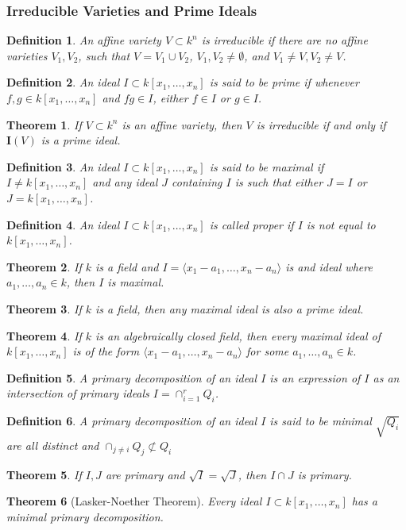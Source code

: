 \documentclass[oneside]{book}
\theoremstyle{mystyle}
\newtheorem{theorem}{Theorem}[section]
\newtheorem{definition}{Definition}[section]
\begin{document}
\subsubsection{Irreducible Varieties and Prime Ideals}
\begin{definition}
An affine variety $V\subset k^n$ is irreducible if there are no affine varieties $V_1, V_2$, such that $V = V_1\cup V_2$, $V_1,V_2\ne \emptyset$, and $V_1 \ne V, V_2 \ne V$.
\end{definition}
\begin{definition}
An ideal $I\subset k[x_1,\hdots ,x_n]$ is said to be prime if whenever $f,g\in k[x_1,\hdots ,x_n]$ and $fg\in I$, either $f\in I$ or $g\in I$.
\end{definition}
\begin{theorem}
If $V\subset k^n$ is an affine variety, then $V$ is irreducible if and only if $\textbf{I}(V)$ is a prime ideal.
\end{theorem}
\begin{definition}
An ideal $I\subset k[x_1,\hdots ,x_n]$ is said to be maximal if $I \ne k[x_1,\hdots ,x_n]$ and any ideal $J$ containing $I$ is such that either $J = I$ or $J = k[x_1,\hdots ,x_n]$.
\end{definition}
\begin{definition}
An ideal $I\subset k[x_1,\hdots ,x_n]$ is called proper if $I$ is not equal to $k[x_1,\hdots ,x_n]$.
\end{definition}
\begin{theorem}
If $k$ is a field and $I = \langle x_1-a_1,\hdots, x_n-a_n\rangle$ is and ideal where $a_1,\hdots, a_n \in k$, then $I$ is maximal.
\end{theorem}
\begin{theorem}
If $k$ is a field, then any maximal ideal is also a prime ideal.
\end{theorem}
\begin{theorem}
If $k$ is an algebraically closed field, then every maximal ideal of $k[x_1,\hdots ,x_n]$ is of the form $\langle x_1-a_1,\hdots, x_n-a_n\rangle$ for some $a_1,\hdots, a_n\in k$.
\end{theorem}
\begin{definition}
A primary decomposition of an ideal $I$ is an expression of $I$ as an intersection of primary ideals $I = \cap_{i=1}^{r} Q_{i}$.
\end{definition}
\begin{definition}
A primary decomposition of an ideal $I$ is said to be minimal $\sqrt{Q_i}$ are all distinct and $\cap_{j\ne i}Q_j \not \subset Q_i$
\end{definition}
\begin{theorem}
If $I,J$ are primary and $\sqrt{I}=\sqrt{J}$, then $I\cap J$ is primary.
\end{theorem}
\begin{theorem}[Lasker-Noether Theorem]
Every ideal $I \subset k[x_1,\hdots ,x_n]$ has a minimal primary decomposition.
\end{theorem}
\end{document}
